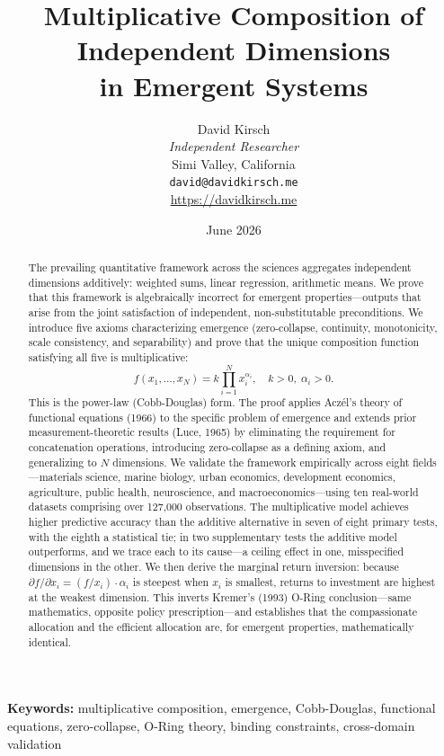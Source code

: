 \documentclass[12pt, a4paper]{article}
\title{\textbf{Multiplicative Composition of Independent Dimensions\\ in Emergent Systems}}
\author{David Kirsch\\
\textit{Independent Researcher}\\
Simi Valley, California\\
\texttt{david@davidkirsch.me}\\
\url{https://davidkirsch.me}}
\date{June 2026}
\theoremstyle{definition}
\theoremstyle{remark}
\begin{document}
\maketitle

\begin{abstract}
The prevailing quantitative framework across the sciences aggregates independent dimensions additively: weighted sums, linear regression, arithmetic means. We prove that this framework is algebraically incorrect for emergent properties---outputs that arise from the joint satisfaction of independent, non-substitutable preconditions. We introduce five axioms characterizing emergence (zero-collapse, continuity, monotonicity, scale consistency, and separability) and prove that the unique composition function satisfying all five is multiplicative:
\[
f(x_1, \ldots, x_N) = k \prod_{i=1}^{N} x_i^{\alpha_i}, \quad k > 0, \; \alpha_i > 0.
\]
This is the power-law (Cobb-Douglas) form. The proof applies Acz\'el's theory of functional equations (1966) to the specific problem of emergence and extends prior measurement-theoretic results (Luce, 1965) by eliminating the requirement for concatenation operations, introducing zero-collapse as a defining axiom, and generalizing to $N$ dimensions. We validate the framework empirically across eight fields---materials science, marine biology, urban economics, development economics, agriculture, public health, neuroscience, and macroeconomics---using ten real-world datasets comprising over 127,000 observations. The multiplicative model achieves higher predictive accuracy than the additive alternative in seven of eight primary tests, with the eighth a statistical tie; in two supplementary tests the additive model outperforms, and we trace each to its cause---a ceiling effect in one, misspecified dimensions in the other. We then derive the marginal return inversion: because $\partial f / \partial x_i = (f / x_i) \cdot \alpha_i$ is steepest when $x_i$ is smallest, returns to investment are highest at the weakest dimension. This inverts Kremer's (1993) O-Ring conclusion---same mathematics, opposite policy prescription---and establishes that the compassionate allocation and the efficient allocation are, for emergent properties, mathematically identical.
\end{abstract}

\vspace{1em}
\noindent\textbf{Keywords:} multiplicative composition, emergence, Cobb-Douglas, functional equations, zero-collapse, O-Ring theory, binding constraints, cross-domain validation
\end{document}
